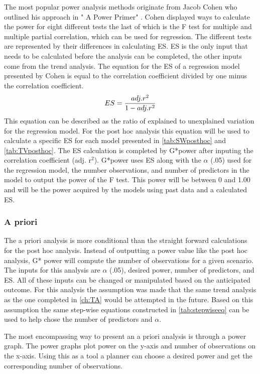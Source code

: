 The most popular power analysis methods originate from Jacob Cohen who outlined his approach in " A Power Primer" \citep{cohen1992power}.
Cohen displayed ways to calculate the power for eight different tests the last of which is the F test for multiple and multiple partial correlation, which can be used for regression.
The different tests are represented by their differences in calculating ES.
ES is the only input that needs to be calculated before the analysis can be completed, the other inputs come from the trend analysis.
The equation for the ES of a regression model presented by Cohen is equal to the correlation coefficient divided by one minus the correlation coefficient.
\begin{equation} \label{eq:ES}
	ES = {adj. r^2 \over {1-adj. r^2}}
\end{equation}
This equation can be described as the ratio of explained to unexplained variation for the regression model.
For the post hoc analysis this equation will be used to calculate a specific ES for each model presented in \autoref{tab:SWposthoc} and \autoref{tab:TVposthoc}.
The ES calculation is completed by G*power after inputing the correlation coefficient (adj. r$^2$).
G*power uses ES along with the $\alpha$ (.05) used for the regression model, the number observations, and number of predictors in the model to output the power of the F test.
This power will be between 0 and 1.00 and will be the power acquired by the models using past data and a calculated ES.

\subsubsection{A priori}

The a priori analysis is more conditional than the straight forward calculations for the post hoc analysis.
Instead of outputting a power value like the post hoc analysis, G* power will compute the number of observations for a given scenario. 
The inputs for this analysis are $\alpha$ (.05), desired power, number of predictors, and ES.
All of these inputs can be changed or manipulated based on the anticipated outcome.
For this analysis the assumption was made that the same trend analysis as the one completed in \autoref{ch:TA} would be attempted in the future.
Based on this assumption the same step-wise equations constructed in \autoref{tab:stepwiseeq} can be used to help chose the number of predictors and $\alpha$.

The most encompassing way to present an a priori analysis is through a power graph.
The power graphs plot power on the y-axis and number of observations on the x-axis.
Using this as a tool a planner can choose a desired power and get the corresponding number of observations.

